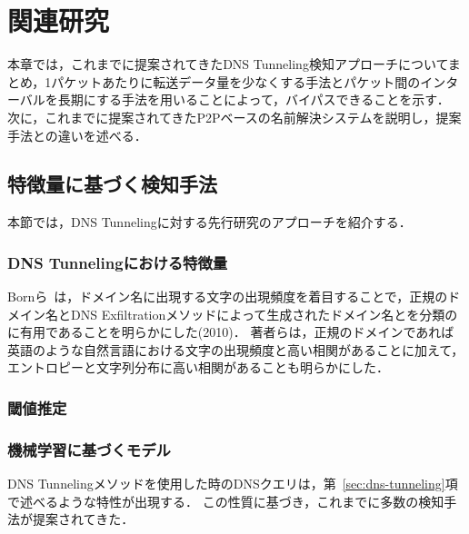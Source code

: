 \section{関連研究}
\label{sec:related-works}
本章では，これまでに提案されてきたDNS Tunneling検知アプローチについてまとめ，1パケットあたりに転送データ量を少なくする手法とパケット間のインターバルを長期にする手法を用いることによって，バイパスできることを示す．
次に，これまでに提案されてきたP2Pベースの名前解決システムを説明し，提案手法との違いを述べる．

\subsection{特徴量に基づく検知手法}
本節では，DNS Tunnelingに対する先行研究のアプローチを紹介する．
\subsubsection{DNS Tunnelingにおける特徴量}
Bornら~\cite{born}は，ドメイン名に出現する文字の出現頻度を着目することで，正規のドメイン名とDNS Exfiltrationメソッドによって生成されたドメイン名とを分類のに有用であることを明らかにした(2010)．
著者らは，正規のドメインであれば英語のような自然言語における文字の出現頻度と高い相関があることに加えて，エントロピーと文字列分布に高い相関があることも明らかにした．


\subsubsection{閾値推定}
\subsubsection{機械学習に基づくモデル}
DNS Tunnelingメソッドを使用した時のDNSクエリは，第~\ref{sec:dns-tunneling}項で述べるような特性が出現する．
この性質に基づき，これまでに多数の検知手法が提案されてきた．



